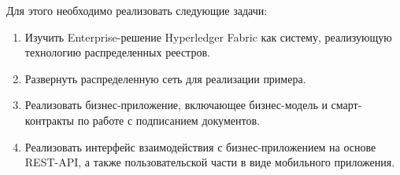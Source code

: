 Для этого необходимо реализовать следующие задачи:
\begin{enumerate}
	\item Изучить Enterprise-решение Hyperledger Fabric как систему, реализующую технологию распределенных реестров.
	\item Развернуть распределенную сеть для реализации примера.
	\item Реализовать	бизнес-приложение,	включающее	бизнес-модель	и смарт-контракты по работе с подписанием документов.
	\item Реализовать интерфейс взаимодействия с бизнес-приложением на основе REST-API, а также пользовательской части в виде мобильного приложения.
\end{enumerate}